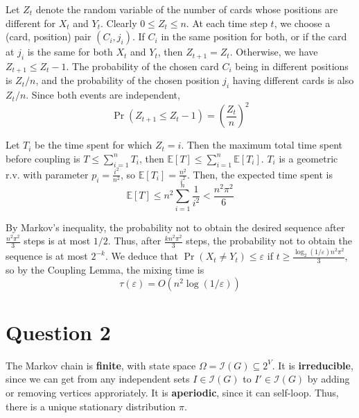 \documentclass[11pt]{article} %
\begin{document}


Let $Z_t$ denote the random variable of the number of cards whose positions are different for $X_t$ and $Y_t$.
Clearly $0\leq Z_t \leq n$. At each time step $t$, we choose a (card, position) pair $(C_i,j_i)$.
If $C_i$ in the same position for both, or if the card at $j_i$ is the same 
for both $X_t$ and $Y_t$, then $Z_{t+1}=Z_t$. 
Otherwise, we have $Z_{t+1} \leq Z_t -1$.
The probability of the chosen card $C_i$ being in different positions is $Z_t/n$,
and the probability of the chosen position $j_i$ having different cards is also $Z_t/n$.
Since both events are independent, 
\[\Pr(Z_{t+1} \leq Z_t - 1) = \left(\frac{Z_t}{n}\right)^2\]

Let $T_i$ be the time spent for which $Z_t=i$. 
Then the maximum total time spent before coupling is $T\leq\sum_{i=1}^n T_i$, 
then $\mathbb{E}[T]\leq\sum_{i=1}^n \mathbb{E}[T_i]$.
$T_i$ is a geometric r.v. with parameter $p_i=\frac{i^2}{n^2}$, so $\mathbb{E}[T_i] = \frac{n^2}{i^2}$.
Then, the expected time spent  is
\[\mathbb{E}[T]\leq n^2\sum_{i=1}^{n} \frac{1}{i^2}< \frac{n^2\pi^2}{6}\]

By Markov's inequality, the probability not to obtain the desired sequence after $\frac{n^2\pi^2}{3}$
steps is at most $1/2$.
Thus, after $\frac{kn^2\pi^2}{3}$ steps, the probability not to obtain the sequence is at most $2^{-k}$.
We deduce that $\Pr(X_t\neq Y_t)\leq \varepsilon$ if $t\geq \frac{\log_2(1/\varepsilon)n^2\pi^2}{3}$,
so by the Coupling Lemma, the mixing time is
\[\tau(\varepsilon) = O(n^2 \log(1/\varepsilon))\]

\section*{Question 2}
The Markov chain is \textbf{finite}, with state space $\Omega=\mathcal{I}(G)\subseteq 2^V$.
It is \textbf{irreducible}, since we can get from any independent sets 
$I\in\mathcal{I}(G)$ to $I'\in\mathcal{I}(G)$ by adding or removing vertices approriately.
It is \textbf{aperiodic}, since it can self-loop. 
Thus, there is a unique stationary distribution $\pi$.
\end{document}
